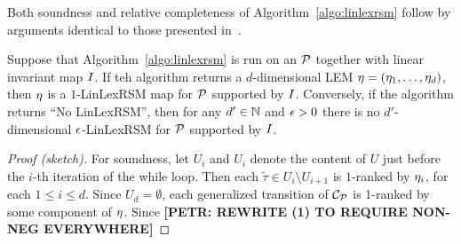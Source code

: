 Both soundness and relative completeness of Algorithm~\ref{algo:linlexrsm} follow by arguments identical to those presented in~\cite{xxx}. 
\begin{theorem}
	Suppose that Algorithm~\ref{algo:linlexrsm} is run on an \APP{} $\mathcal{P}$ together with linear invariant map $I$. If teh algorithm returns a $d$-dimensional LEM $\mathbf{\eta}=(\eta_1,\dots,\eta_d)$, then $\mathbf{\eta}$ is a $1$-LinLexRSM map for $\mathcal{P}$ supported by $I$. Conversely, if the algorithm returns ``No LinLexRSM'', then for any $d'\in \mathbb{N}$ and $\epsilon>0$ there is no $d'$-dimensional $\epsilon$-LinLexRSM for $\mathcal{P}$  supported by $I$.
\end{theorem}
\begin{proof}[Proof (sketch)]
For soundness, let $U_i$ and $U_{i}$ denote the content of $U$ just before the $i$-th iteration of the while loop. Then each $\tilde{\tau}\in U_{i}\setminus U_{i+1}$ is $1$-ranked by $\eta_i$, for each $1\leq i \leq d$. Since $U_{d}=\emptyset$, each generalized transition of $\mathcal{C}_{\mathcal{P}}$ is 1-ranked by some component of $\mathbf{\eta}$. Since \textbf{[PETR: REWRITE (1) TO REQUIRE NON-NEG EVERYWHERE]}
\end{proof}

\